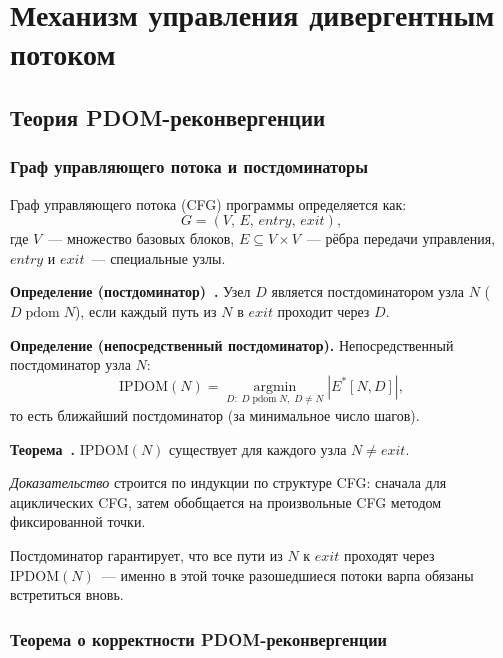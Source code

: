 \section{Механизм управления дивергентным потоком}

\subsection{Теория PDOM-реконвергенции}

\subsubsection{Граф управляющего потока и постдоминаторы}

Граф управляющего потока (CFG) программы определяется как:
\begin{equation}
  G = (V,\, E,\, \mathit{entry},\, \mathit{exit}),
\end{equation}
где $V$~--- множество базовых блоков,
$E \subseteq V \times V$~--- рёбра передачи управления,
$\mathit{entry}$ и $\mathit{exit}$~--- специальные узлы.

\textbf{Определение (постдоминатор)~\cite{Lengauer1979, AhoUllman2006}.}
Узел $D$ является постдоминатором
узла $N$ ($D \;\mathrm{pdom}\; N$), если каждый путь из $N$ в
$\mathit{exit}$ проходит через $D$.

\textbf{Определение (непосредственный постдоминатор).}
Непосредственный постдоминатор узла $N$:
\begin{equation}
  \mathrm{IPDOM}(N) = \operatorname*{argmin}_{D:\; D \;\mathrm{pdom}\; N,\; D \neq N}
    |E^*[N, D]|,
\end{equation}
то есть ближайший постдоминатор (за минимальное число шагов).

\textbf{Теорема~\cite{Lengauer1979}.} $\mathrm{IPDOM}(N)$ существует для каждого узла
$N \neq \mathit{exit}$.

\textit{Доказательство} строится по индукции по структуре CFG:
сначала для ациклических CFG, затем обобщается на произвольные CFG
методом фиксированной точки.

Постдоминатор гарантирует, что все пути из $N$ к $\mathit{exit}$
проходят через $\mathrm{IPDOM}(N)$~--- именно в этой точке разошедшиеся
потоки варпа обязаны встретиться вновь.

\subsubsection{Теорема о корректности PDOM-реконвергенции}

